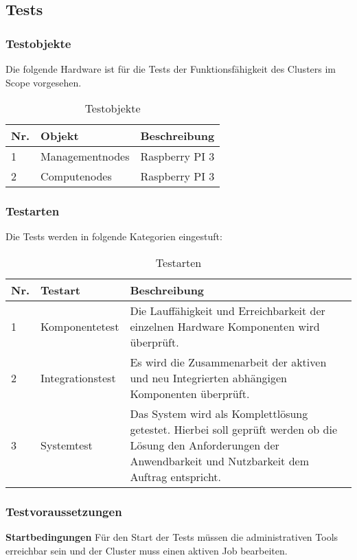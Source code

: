\subsection{Tests}
\subsubsection{Testobjekte}
Die folgende Hardware ist für die Tests der Funktionsfähigkeit des Clusters im Scope vorgesehen.
\begin{table}[H]
\centering
\begin{tabular}{p{1cm}p{}p{7.5cm}}
\hline
\rowcolor{heading} \textbf{Nr.} & \textbf{Objekt} & \textbf{Beschreibung} \\\hline
1 & Managementnodes & Raspberry PI 3  \\\hline
2 & Computenodes & Raspberry PI 3 \\\hline
\end{tabular}
\caption{Testobjekte}
\end{table}

\subsubsection{Testarten}
Die Tests werden in folgende Kategorien eingestuft:

\begin{table}[H]
\centering
\begin{tabular}{p{1cm}p{3cm}p{12cm}}
\hline
\rowcolor{heading} \textbf{Nr.} & \textbf{Testart} & \textbf{Beschreibung} \\\hline
1 & Komponentetest & Die Lauffähigkeit und Erreichbarkeit der einzelnen Hardware Komponenten wird überprüft.  \\\hline
2 & Integrationstest & Es wird die Zusammenarbeit der aktiven und neu Integrierten abhängigen Komponenten überprüft. \\\hline
3 & Systemtest & Das System wird als Komplettlösung getestet. Hierbei soll geprüft werden ob die Lösung den Anforderungen der Anwendbarkeit und Nutzbarkeit dem Auftrag entspricht.  \\\hline
\end{tabular}
\caption{Testarten}
\end{table}

\subsubsection{Testvoraussetzungen}
\textbf{Startbedingungen}\newline
Für den Start der Tests müssen die administrativen Tools erreichbar sein und der Cluster muss einen aktiven Job bearbeiten.


